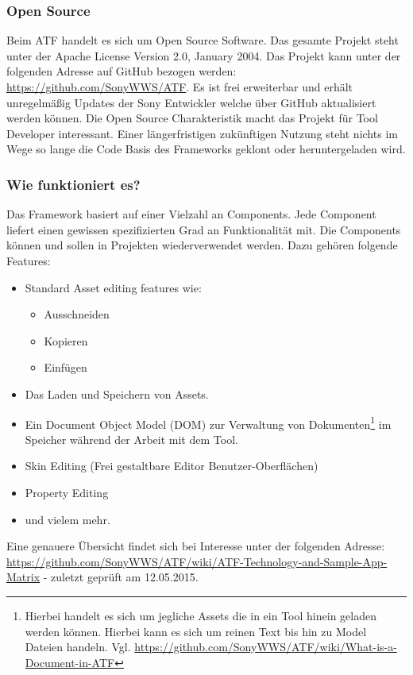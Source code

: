 \documentclass[pagesize, paper=a4, fontsize=12pt, titlepage=true, headings=small, headnosepline, abstractoff, liststotoc, nochapterprefix, plainheadsepline, twoside]{scrreprt}
\begin{document}
\subsubsection{Open Source}
Beim ATF handelt es sich um Open Source Software. Das gesamte Projekt steht unter der Apache License Version 2.0, January 2004. Das Projekt kann unter der folgenden Adresse auf GitHub bezogen werden: \url{https://github.com/SonyWWS/ATF}. Es ist frei erweiterbar und erhält unregelmäßig Updates der Sony Entwickler welche über GitHub aktualisiert werden können. Die Open Source Charakteristik macht das Projekt für Tool Developer interessant. Einer längerfristigen zukünftigen Nutzung steht nichts im Wege so lange die Code Basis des Frameworks geklont oder heruntergeladen wird. 

\subsubsection{Wie funktioniert es?}
Das Framework basiert auf einer Vielzahl an Components. Jede Component liefert einen gewissen spezifizierten Grad an Funktionalität mit. Die Components können und sollen in Projekten wiederverwendet werden. Dazu gehören folgende Features:

\begin{itemize}
\item Standard Asset editing features wie:

	\begin{itemize}
	\item Ausschneiden
	\item Kopieren
	\item Einfügen
	\end{itemize}

\item Das Laden und Speichern von Assets.
\item Ein Document Object Model (DOM) zur Verwaltung von Dokumenten\footnote{Hierbei handelt es sich um jegliche Assets die in ein Tool hinein geladen werden können. Hierbei kann es sich um reinen Text bis hin zu Model Dateien handeln. Vgl. \url{https://github.com/SonyWWS/ATF/wiki/What-is-a-Document-in-ATF}} im Speicher während der Arbeit mit dem Tool.
\item Skin Editing (Frei gestaltbare Editor Benutzer-Oberflächen)
\item Property Editing
\item und vielem mehr.
\end{itemize}

Eine genauere Übersicht findet sich bei Interesse unter der folgenden Adresse: \url{https://github.com/SonyWWS/ATF/wiki/ATF-Technology-and-Sample-App-Matrix} - zuletzt geprüft am 12.05.2015.
\end{document}
